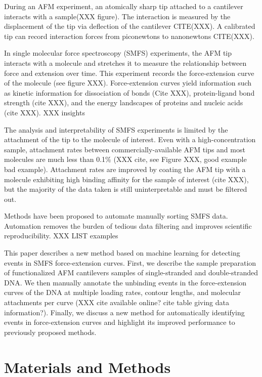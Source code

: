\documentclass[%
  aip,12pt,tightenlines,
  amsthm,
 amsmath,amssymb
]{article}
\newcommand{\sLabel}[1]{\label{section:#1}}
\newcommand{\pl}[0]{\vspace{6pt}}
\newcommand{\singlemol}[0]{SMFS}
\begin{document}
During an AFM experiment, an atomically sharp tip attached to a cantilever interacts with a sample(XXX figure). The interaction is measured by the displacement of the tip via deflection of the cantilever CITE(XXX). A calibrated tip can record interaction forces from piconewtons to nanonewtons CITE(XXX). \pl

In single molecular force spectroscopy (\singlemol{}) experiments, the AFM tip interacts with a molecule and stretches it to measure the relationship between force and extension over time. This experiment records the force-extension curve of the molecule (see figure XXX). Force-extension curves yield information such as kinetic information for dissociation of bonds (Cite XXX), protein-ligand bond strength (cite XXX), and the energy landscapes of proteins and nucleic acids (cite XXX). XXX insights \pl

The analysis and interpretability of \singlemol{} experiments is limited by the attachment of the tip to the molecule of interest. Even with a high-concentration sample, attachment rates between commercially-available AFM tips and most molecules are much less than 0.1\% (XXX cite, see Figure XXX, good example bad example). Attachment rates are improved by coating the AFM tip with a molecule exhibiting high binding affinity for the sample of interest (cite XXX), but the majority of the data taken is still uninterpretable and must be filtered out.\pl

Methods have been proposed to automate manually sorting \singlemol{} data. Automation removes the burden of tedious data filtering and improves scientific reproducibility. XXX LIST examples \pl

This paper describes a new method based on machine learning for detecting events in SMFS force-extension curves.  First, we describe the sample preparation of functionalized AFM cantilevers samples of single-stranded and double-stranded DNA. We then manually annotate the unbinding events in the force-extension curves of the DNA at multiple loading rates, contour lengths, and molecular attachments per curve (XXX cite available online? cite table giving data information?). Finally, we discuss a new method for automatically identifying events in force-extension curves and highlight its improved performance to previously proposed methods. \pl


\section{\sLabel{Materials}Materials and Methods}
\end{document}
